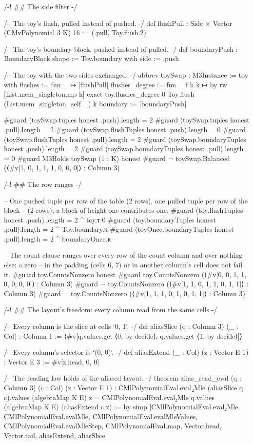 \begin{leancode}
/-! ## The side filter -/

/-- The toy's flush, pulled instead of pushed. -/
def flushPull : Side × Vector (CMvPolynomial 3 K) 16 := (.pull, Toy.flush.2)

/-- The toy's boundary block, pushed instead of pulled. -/
def boundaryPush : BoundaryBlock shape := { Toy.boundary with side := .push }

/-- The toy with the two sides exchanged. -/
abbrev toySwap : M3Instance :=
  { toy with
    flushes := fun _ ↦ [flushPull]
    flushes_degree := fun _ f h k ↦ by
      rw [List.mem_singleton.mp h]
      exact toy.flushes_degree 0 Toy.flush (List.mem_singleton_self _) k
    boundary := [boundaryPush] }

#guard (toySwap.tuples honest .push).length = 2
#guard (toySwap.tuples honest .pull).length = 2
#guard (toySwap.flushTuples honest .push).length = 0
#guard (toySwap.flushTuples honest .pull).length = 2
#guard (toySwap.boundaryTuples honest .push).length = 2
#guard (toySwap.boundaryTuples honest .pull).length = 0
#guard M3Holds toySwap (1 : K) honest
#guard ¬ toySwap.Balanced (⟨#v[1, 0, 1, 1, 1, 0, 0, 0]⟩ : Column 3)

/-! ## The row ranges -/

-- One pushed tuple per row of the table (2 rows), one pulled tuple per row of the block
-- (2 rows); a block of height one contributes one.
#guard (toy.flushTuples honest .push).length = 2 ^ toy.τ 0
#guard (toy.boundaryTuples honest .pull).length = 2 ^ Toy.boundary.κ
#guard (toyOnce.boundaryTuples honest .pull).length = 2 ^ boundaryOnce.κ

-- The count clause ranges over every row of the count column and over nothing else: a zero
-- in the padding (cells 6, 7) or in another column's cell does not fail it.
#guard toy.CountsNonzero honest
#guard toy.CountsNonzero (⟨#v[0, 0, 1, 1, 0, 0, 0, 0]⟩ : Column 3)
#guard ¬ toy.CountsNonzero (⟨#v[1, 1, 0, 1, 1, 0, 1, 1]⟩ : Column 3)
#guard ¬ toy.CountsNonzero (⟨#v[1, 1, 1, 0, 1, 0, 1, 1]⟩ : Column 3)

/-! ## The layout's freedom: every column read from the same cells -/

/-- Every column is the slice at cells `0, 1`. -/
def aliasSlice (q : Column 3) (_ : Col) : Column 1 :=
  ⟨#v[q.values.get ⟨0, by decide⟩, q.values.get ⟨1, by decide⟩]⟩

/-- Every column's selector is `(0, 0)`. -/
def aliasExtend (_ : Col) (z : Vector E 1) : Vector E 3 := #v[z.head, 0, 0]

/-- The reading law holds of the aliased layout. -/
theorem alias_read_eval (q : Column 3) (c : Col) (z : Vector E 1) :
    CMlPolynomialEval.eval₂Mle (aliasSlice q c).values (algebraMap K E) z =
      CMlPolynomialEval.eval₂Mle q.values (algebraMap K E) (aliasExtend c z) := by
  simp [CMlPolynomialEval.eval₂Mle, CMlPolynomialEval.evalMle,
    CMlPolynomialEval.evalMleValues, CMlPolynomialEval.evalMleStep, CMlPolynomialEval.map,
    Vector.head, Vector.tail, aliasExtend, aliasSlice]


\end{leancode}
